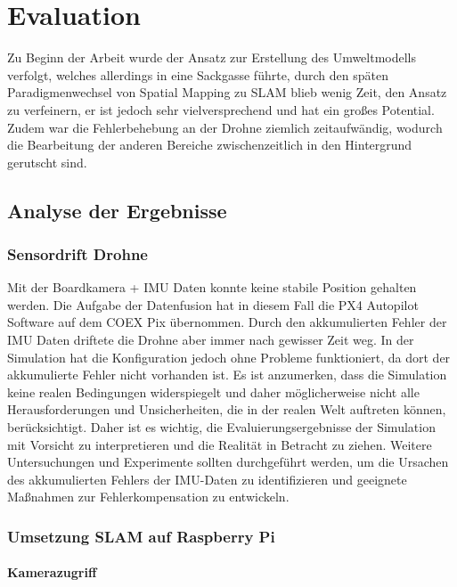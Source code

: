 \chapter{Evaluation}

Zu Beginn der Arbeit wurde der Ansatz zur Erstellung des Umweltmodells verfolgt, welches allerdings in eine Sackgasse führte, durch den späten Paradigmenwechsel von Spatial Mapping zu \ac{SLAM} blieb wenig Zeit, den Ansatz zu verfeinern, er ist jedoch sehr vielversprechend und hat ein großes Potential.
Zudem war die Fehlerbehebung an der Drohne ziemlich zeitaufwändig, wodurch die Bearbeitung der anderen Bereiche zwischenzeitlich in den Hintergrund gerutscht sind.

\section{Analyse der Ergebnisse}
\subsection{Sensordrift Drohne}

Mit der Boardkamera + \ac{IMU} Daten konnte keine stabile Position gehalten werden. Die Aufgabe der Datenfusion hat in diesem Fall die PX4 Autopilot Software auf dem COEX Pix übernommen.
Durch den akkumulierten Fehler der \ac{IMU} Daten driftete die Drohne aber immer nach gewisser Zeit weg. In der Simulation hat die Konfiguration jedoch ohne Probleme funktioniert, da dort der akkumulierte Fehler nicht vorhanden ist.
Es ist anzumerken, dass die Simulation keine realen Bedingungen widerspiegelt und daher möglicherweise nicht alle Herausforderungen und Unsicherheiten, die in der realen Welt auftreten können, berücksichtigt. Daher ist es wichtig, die Evaluierungsergebnisse der Simulation mit Vorsicht zu interpretieren und die Realität in Betracht zu ziehen. Weitere Untersuchungen und Experimente sollten durchgeführt werden, um die Ursachen des akkumulierten Fehlers der \ac{IMU}-Daten zu identifizieren und geeignete Maßnahmen zur Fehlerkompensation zu entwickeln.


\subsection{Umsetzung SLAM auf Raspberry Pi}

\subsubsection{Kamerazugriff}

